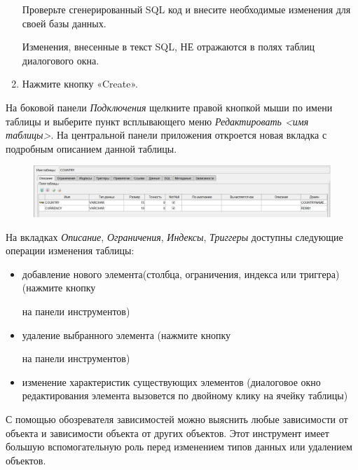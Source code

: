 \begin{enumerate}[leftmargin=26pt]
	Проверьте сгенерированный SQL код и внесите необходимые изменения для своей базы данных.
	
	Изменения, внесенные в текст SQL, НЕ отражаются в полях таблиц диалогового окна.
	\item Нажмите кнопку «Create».
\end{enumerate}

\label{sec:alttable}
На боковой панели \textit{Подключения} щелкните правой кнопкой мыши по имени таблицы и выберите пункт всплывающего меню \textit{Редактировать <имя таблицы>}. На центральной панели приложения откроется новая вкладка с подробным описанием данной таблицы. 

\begin{figure}[H]
	\centering
	\includegraphics[width = 1\linewidth]{img/alter_table.png}
\end{figure}

На вкладках \textit{Описание}, \textit{Ограничения}, \textit{Индексы}, \textit{Триггеры} доступны следующие операции изменения таблицы:
\begin{itemize}
	\item добавление нового элемента(столбца, ограничения, индекса или триггера) (нажмите кнопку  на панели инструментов)
	\item удаление выбранного элемента (нажмите кнопку  на панели инструментов)
	\item изменение характеристик существующих элементов (диалоговое окно редактирования элемента вызовется по двойному клику на ячейку таблицы)
\end{itemize}


С помощью обозревателя зависимостей можно выяснить любые зависимости от объекта и зависимости объекта от других объектов. Этот инструмент имеет большую вспомогательную роль перед изменением типов данных или удалением объектов.

